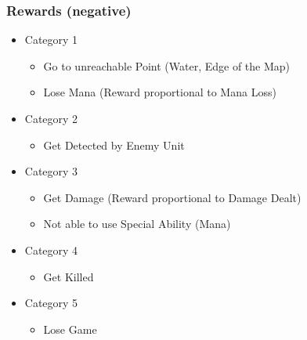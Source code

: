 \documentclass[ignorenonframetext]{beamer}
\begin{document}
\begin{frame}
\frametitle{Rewards (negative)}
\begin{itemize}
\item Category 1
	\begin{itemize}
	\item Go to unreachable Point (Water, Edge of the Map)
	\item Lose Mana (Reward proportional to Mana Loss)	
	\end{itemize}
\item Category 2
	\begin{itemize}
	\item Get Detected by Enemy Unit
	\end{itemize}
\item Category 3
	\begin{itemize}
	\item Get Damage (Reward proportional to Damage Dealt)
	\item Not able to use Special Ability (Mana)
	\end{itemize}
\item Category 4
	\begin{itemize}
	\item Get Killed
	\end{itemize}
\item Category 5
	\begin{itemize}
	\item Lose Game
	\end{itemize}

\end{itemize}
\end{frame}
\end{document}
